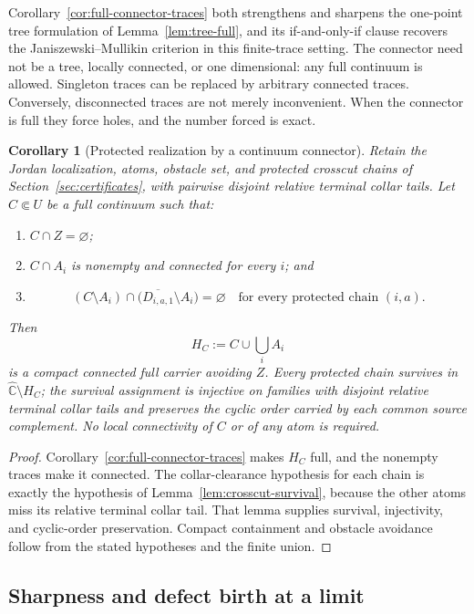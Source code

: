\documentclass[11pt,reqno]{amsart}
\newtheorem{corollary}[theorem]{Corollary}
\theoremstyle{definition}
\theoremstyle{remark}
\newcommand{\Chat}{\widehat{\mathbb C}}
\begin{document}
Corollary~\ref{cor:full-connector-traces} both strengthens and sharpens
the one-point tree formulation of Lemma~\ref{lem:tree-full}, and its
if-and-only-if clause recovers the Janiszewski--Mullikin criterion in this
finite-trace setting.  The connector need not be a tree, locally
connected, or one dimensional: any full continuum is allowed.  Singleton
traces can be replaced by arbitrary connected traces.  Conversely,
disconnected traces are not merely inconvenient.  When the connector is
full they force holes, and the number forced is exact.

\begin{corollary}[Protected realization by a continuum connector]
\label{cor:continuum-connector}
Retain the Jordan localization, atoms, obstacle set, and protected
crosscut chains of Section~\ref{sec:certificates}, with pairwise disjoint
relative terminal collar tails.  Let $C\Subset U$ be a full continuum such
that:
\begin{enumerate}
\item $C\cap Z=\varnothing$;
\item $C\cap A_i$ is nonempty and connected for every $i$; and
\item
\[
 (C\setminus A_i)\cap
 \bigl(\overline{D_{i,a,1}}\setminus A_i\bigr)=\varnothing
 \quad\text{for every protected chain }(i,a).
\]
\end{enumerate}
Then
\[
 H_C:=C\cup\bigcup_iA_i
\]
is a compact connected full carrier avoiding $Z$.  Every protected chain
survives in $\Chat\setminus H_C$; the survival assignment is injective on
families with disjoint relative terminal collar tails and preserves the
cyclic order carried by each common source complement.  No local
connectivity of $C$ or of any atom is required.
\end{corollary}

\begin{proof}
Corollary~\ref{cor:full-connector-traces} makes $H_C$ full, and the nonempty
traces make it connected.  The collar-clearance hypothesis for each chain is
exactly the hypothesis of Lemma~\ref{lem:crosscut-survival}, because the
other atoms miss its relative terminal collar tail.  That lemma supplies
survival, injectivity, and cyclic-order preservation.  Compact containment
and obstacle avoidance follow from the stated hypotheses and the finite
union.
\end{proof}

\subsection{Sharpness and defect birth at a limit}
\label{subsec:G-limit-defect}
\end{document}
